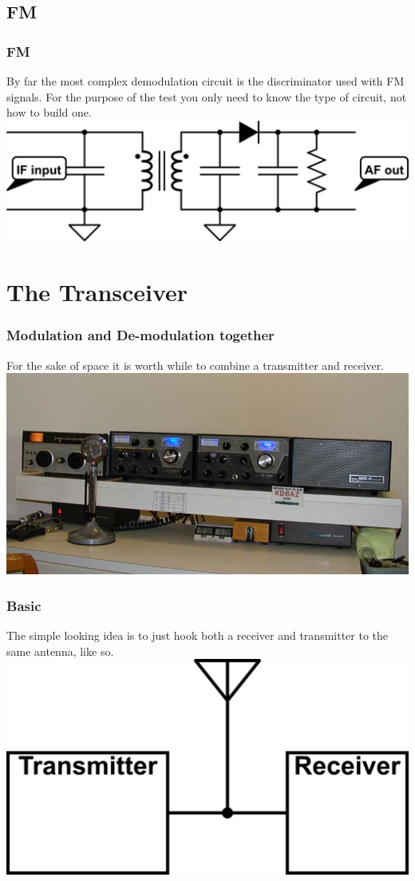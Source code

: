 \documentclass[10pt]{beamer}
\begin{document}
\subsection{FM}
\begin{frame}
\frametitle{FM}
By far the most complex demodulation circuit is the discriminator used with FM signals. For the purpose of the test you only need to know the type of circuit, not how to build one. 
\includegraphics[width=.9\textwidth]{simplediscriminator.png}
\end{frame}

\section{The Transceiver}
\begin{frame}
\frametitle{Modulation and De-modulation together}
For the sake of space it is worth while to combine a transmitter and receiver.
\includegraphics[height=.6\textheight]{drake4.jpg}
\end{frame}

\begin{frame}
\frametitle{Basic}
The simple looking idea is to just hook both a receiver and transmitter to the same antenna, like so.
\includegraphics[height=.5\textheight]{simpletr.png}
\end{frame}
\end{document}

